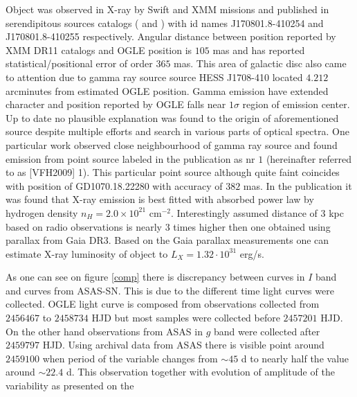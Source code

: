\documentclass{pracalicmgr}
\begin{document}
Object was observed in X-ray by Swift and XMM missions and published in serendipitous sources catalogs (\citep{evans_2sxps_2020} and \citep{traulsen_xmm-newton_2020}) with id names J170801.8-410254 and J170801.8-410255
respectively. Angular distance between position reported by XMM DR11 catalogs \citep{traulsen_xmm-newton_2020}  and OGLE position is $105$ mas and has reported statistical/positional error of order $365$ mas.
This area of galactic disc also came to attention 
due to gamma ray source source HESS J1708-410 \citep{aharonian_hess_2008} located $4.212$ arcminutes from estimated OGLE position. 
Gamma emission have extended character and position reported by OGLE falls near $1\sigma$ region of emission center.
Up to date no plausible explanation was found to the origin
of aforementioned source despite multiple efforts and search in various parts of optical spectra. One particular work \citep{van_etten_multi-wavelength_2009} observed close neighbourhood of
gamma ray source and found emission from point source labeled in the publication as nr $1$ (hereinafter referred to as [VFH2009] 1).
This particular point source although quite faint coincides with  position of GD1070.18.22280 with accuracy of $382$ mas. 
In the publication it was found that X-ray emission is best fitted with absorbed power law by hydrogen density $n_H=2.0\times 10^{21}$ $\textrm{cm}^{-2}$.
Interestingly assumed distance of $3$ kpc based on radio observations is nearly $3$ times higher then one obtained using parallax from Gaia DR3. %
Based on the Gaia parallax measurements one can estimate X-ray luminosity of object to $L_{X}=1.32\cdot10^{31}$ erg/s. 
\newline
\par \hspace{1cm} As one can see on figure \ref{comp} there is discrepancy between curves in $I$ band and curves from ASAS-SN. This is due to the different time light curves were collected. OGLE 
light curve is composed from observations collected from $2456467$ to $2458734$ HJD but most samples were collected before $2457201$ HJD. On the other hand
observations from ASAS in $g$ band were collected after $2459797$ HJD. Using archival data from ASAS there is visible point around $2459100$ when period of the 
variable changes from $\sim 45$ d to nearly half the value around $\sim22.4$ d. This observation together with evolution of amplitude of the variability as presented on the
\end{document}
